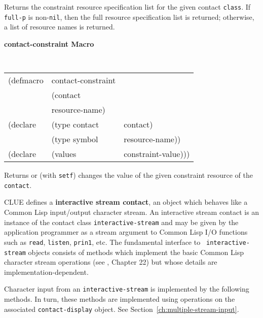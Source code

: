 \begin{flushright} \parbox[t]{6.125in}{
Returns the constraint resource specification list for the given contact
{\tt class}. If
{\tt full-p} is non-{\tt nil}, then the full resource specification list is
returned; otherwise, a list of resource names is returned.

}\end{flushright}

{\samepage
{\large {\bf contact-constraint \hfill Macro}} 
\begin{flushright} \parbox[t]{6.125in}{
\tt
\begin{tabular}{lll}
\raggedright
(defmacro & contact-constraint & \\ 
& (contact\\
& resource-name) \\
(declare & (type contact & contact)\\
         & (type symbol  & resource-name))\\
(declare &(values  & constraint-value)))
\end{tabular}
\rm

}\end{flushright}}

\begin{flushright} \parbox[t]{6.125in}{
Returns or (with {\tt setf}) changes the value of the given constraint
resource of the {\tt contact}.

}\end{flushright}



CLUE defines a {\bf interactive stream contact}, an object
which behaves like
a Common Lisp input/output character stream.  An interactive stream
contact is an instance of the contact class {\tt interactive-stream} and may
be given by the application programmer as a stream argument to Common
Lisp I/O functions such as {\tt read},
{\tt listen}, {\tt prin1}, etc. The fundamental interface to {\tt
interactive-stream} objects consists of methods which implement the basic Common Lisp
character stream operations (see \cite{cltl}, Chapter 22) but whose details are
implementation-dependent.
  
Character input from an {\tt interactive-stream} is implemented by the following
methods. In turn, these methods are implemented using operations on the
associated {\tt contact-display} object. See Section~\ref{ch:multiple-stream-input}.
 

